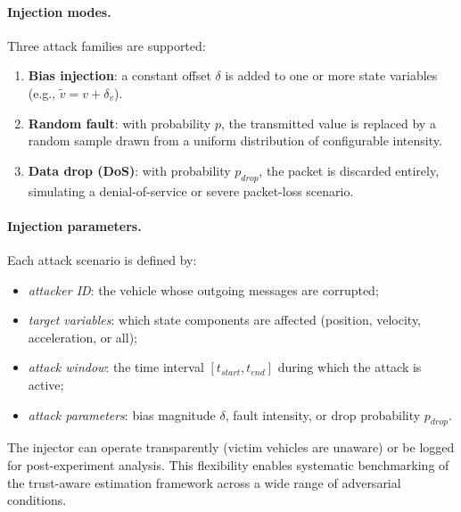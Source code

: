 \paragraph{Injection modes.}
Three attack families are supported:
\begin{enumerate}
	\item \textbf{Bias injection}: a constant offset $\delta$ is added to one or more state variables (e.g., $\tilde{v} = v + \delta_v$).
	\item \textbf{Random fault}: with probability $p$, the transmitted value is replaced by a random sample drawn from a uniform distribution of configurable intensity.
	\item \textbf{Data drop (DoS)}: with probability $p_{drop}$, the packet is discarded entirely, simulating a denial-of-service or severe packet-loss scenario.
\end{enumerate}

\paragraph{Injection parameters.}
Each attack scenario is defined by:
\begin{itemize}
	\item \emph{attacker ID}: the vehicle whose outgoing messages are corrupted;
	\item \emph{target variables}: which state components are affected (position, velocity, acceleration, or all);
	\item \emph{attack window}: the time interval $[t_{start}, t_{end}]$ during which the attack is active;
	\item \emph{attack parameters}: bias magnitude $\delta$, fault intensity, or drop probability $p_{drop}$.
\end{itemize}
The injector can operate transparently (victim vehicles are unaware) or be logged for post-experiment analysis.
This flexibility enables systematic benchmarking of the trust-aware estimation framework across a wide range of adversarial conditions.

